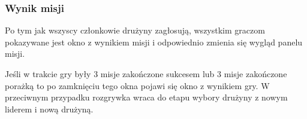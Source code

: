 \documentclass[12pt]{article}
\begin{document}
\subsubsection{Wynik misji}
Po tym jak wszyscy członkowie drużyny zagłosują, wszystkim graczom pokazywane jest okno z wynikiem misji i odpowiednio zmienia się wygląd panelu misji.
\begin{figure}[!htb]
    \centering
    \centering
\end{figure}
Jeśli w trakcie gry były 3 misje zakończone sukcesem lub 3 misje zakończone porażką to po zamknięciu tego okna pojawi się okno z wynikiem gry.
W przeciwnym przypadku rozgrywka wraca do etapu wybory drużyny z nowym liderem i nową drużyną.
\end{document}
